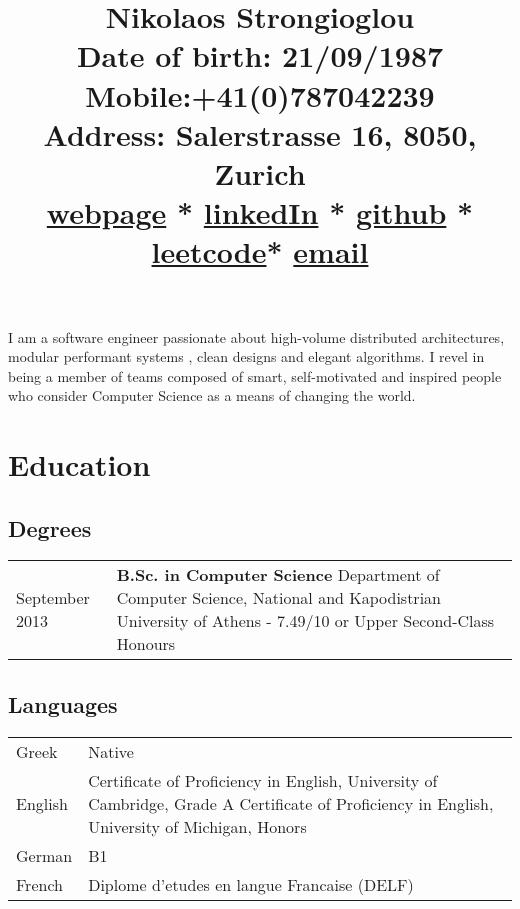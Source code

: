 \documentclass{article}
\begin{document}
	\title{\Huge{\vspace{-3.5cm} \color{NavyBlue}Nikolaos Strongioglou } \\ \small{\textbf{Date of birth}: 21/09/1987\\
			\textbf{Mobile}:+41(0)787042239\\
			\textbf{Address}: Salerstrasse 16, 8050, Zurich\\
			\href{http://tonyflow.github.io/}{webpage} * \href{https://www.linkedin.com/in/nikolaos-strongioglou/}{linkedIn} * \href{https://github.com/tonyflow}{github} * \href{https://leetcode.com/nikostr/}{leetcode}* \href{mailto:nikos.strongioglou@gmail.com}{email}
		} }
	\author{}
	\date{}
	\maketitle
	
	\vspace{-1.4cm}
	\noindent
	I am a software engineer passionate about high-volume distributed architectures, modular performant systems , clean designs and elegant algorithms. I revel in being a member of teams composed of smart, self-motivated and inspired people who consider Computer Science as a means of changing the world.

	\section*{\color{NavyBlue} Education}
	\vspace{-0.5cm}
	{\color{NavyBlue} \hrulefill}
	
	\subsection*{Degrees}
	\begin{tabular}{p{2cm}  p{12cm}}
		\small September 2013 & \textbf{B.Sc. in Computer Science} \newline
			Department of Computer Science, National and Kapodistrian University of Athens - 7.49/10 or Upper Second-Class Honours
	\end{tabular}

	\subsection*{Languages}
		\begin{tabular}{p{2cm}  p{12cm}}
			Greek & Native \\
			English & Certificate of Proficiency in English, University of Cambridge, Grade A \newline
							Certificate of Proficiency in English, University of Michigan, Honors \\
			German & B1 \\
			French & Diplome d’etudes en langue Francaise (DELF) 
		\end{tabular}
\end{document}
